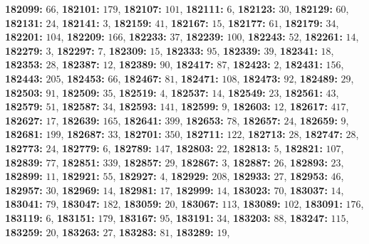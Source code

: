 \textsf{\bfseries 182099:} $66$, \textsf{\bfseries 182101:} $179$, \textsf{\bfseries 182107:} $101$, \textsf{\bfseries 182111:} $6$, \textsf{\bfseries 182123:} $30$, \textsf{\bfseries 182129:} $60$, \textsf{\bfseries 182131:} $24$, \textsf{\bfseries 182141:} $3$, \textsf{\bfseries 182159:} $41$, \textsf{\bfseries 182167:} $15$, \textsf{\bfseries 182177:} $61$, \textsf{\bfseries 182179:} $34$, \textsf{\bfseries 182201:} $104$, \textsf{\bfseries 182209:} $166$, \textsf{\bfseries 182233:} $37$, \textsf{\bfseries 182239:} $100$, \textsf{\bfseries 182243:} $52$, \textsf{\bfseries 182261:} $14$, \textsf{\bfseries 182279:} $3$, \textsf{\bfseries 182297:} $7$, \textsf{\bfseries 182309:} $15$, \textsf{\bfseries 182333:} $95$, \textsf{\bfseries 182339:} $39$, \textsf{\bfseries 182341:} $18$, \textsf{\bfseries 182353:} $28$, \textsf{\bfseries 182387:} $12$, \textsf{\bfseries 182389:} $90$, \textsf{\bfseries 182417:} $87$, \textsf{\bfseries 182423:} $2$, \textsf{\bfseries 182431:} $156$, \textsf{\bfseries 182443:} $205$, \textsf{\bfseries 182453:} $66$, \textsf{\bfseries 182467:} $81$, \textsf{\bfseries 182471:} $108$, \textsf{\bfseries 182473:} $92$, \textsf{\bfseries 182489:} $29$, \textsf{\bfseries 182503:} $91$, \textsf{\bfseries 182509:} $35$, \textsf{\bfseries 182519:} $4$, \textsf{\bfseries 182537:} $14$, \textsf{\bfseries 182549:} $23$, \textsf{\bfseries 182561:} $43$, \textsf{\bfseries 182579:} $51$, \textsf{\bfseries 182587:} $34$, \textsf{\bfseries 182593:} $141$, \textsf{\bfseries 182599:} $9$, \textsf{\bfseries 182603:} $12$, \textsf{\bfseries 182617:} $417$, \textsf{\bfseries 182627:} $17$, \textsf{\bfseries 182639:} $165$, \textsf{\bfseries 182641:} $399$, \textsf{\bfseries 182653:} $78$, \textsf{\bfseries 182657:} $24$, \textsf{\bfseries 182659:} $9$, \textsf{\bfseries 182681:} $199$, \textsf{\bfseries 182687:} $33$, \textsf{\bfseries 182701:} $350$, \textsf{\bfseries 182711:} $122$, \textsf{\bfseries 182713:} $28$, \textsf{\bfseries 182747:} $28$, \textsf{\bfseries 182773:} $24$, \textsf{\bfseries 182779:} $6$, \textsf{\bfseries 182789:} $147$, \textsf{\bfseries 182803:} $22$, \textsf{\bfseries 182813:} $5$, \textsf{\bfseries 182821:} $107$, \textsf{\bfseries 182839:} $77$, \textsf{\bfseries 182851:} $339$, \textsf{\bfseries 182857:} $29$, \textsf{\bfseries 182867:} $3$, \textsf{\bfseries 182887:} $26$, \textsf{\bfseries 182893:} $23$, \textsf{\bfseries 182899:} $11$, \textsf{\bfseries 182921:} $55$, \textsf{\bfseries 182927:} $4$, \textsf{\bfseries 182929:} $208$, \textsf{\bfseries 182933:} $27$, \textsf{\bfseries 182953:} $46$, \textsf{\bfseries 182957:} $30$, \textsf{\bfseries 182969:} $14$, \textsf{\bfseries 182981:} $17$, \textsf{\bfseries 182999:} $14$, \textsf{\bfseries 183023:} $70$, \textsf{\bfseries 183037:} $14$, \textsf{\bfseries 183041:} $79$, \textsf{\bfseries 183047:} $182$, \textsf{\bfseries 183059:} $20$, \textsf{\bfseries 183067:} $113$, \textsf{\bfseries 183089:} $102$, \textsf{\bfseries 183091:} $176$, \textsf{\bfseries 183119:} $6$, \textsf{\bfseries 183151:} $179$, \textsf{\bfseries 183167:} $95$, \textsf{\bfseries 183191:} $34$, \textsf{\bfseries 183203:} $88$, \textsf{\bfseries 183247:} $115$, \textsf{\bfseries 183259:} $20$, \textsf{\bfseries 183263:} $27$, \textsf{\bfseries 183283:} $81$, \textsf{\bfseries 183289:} $19$, 
